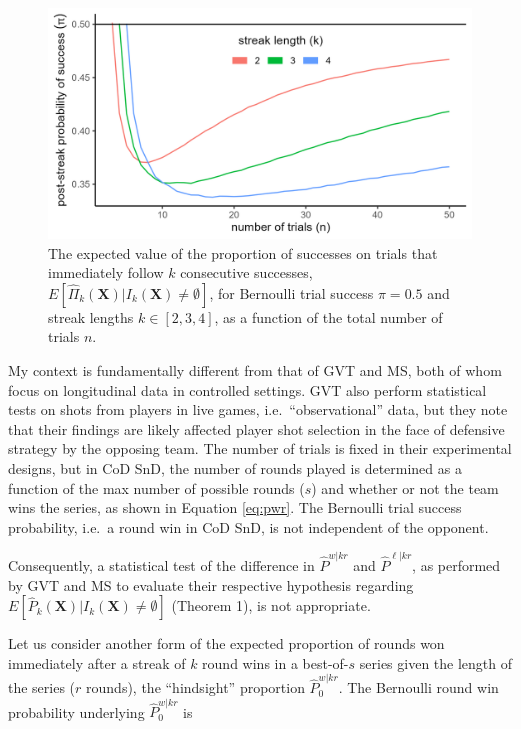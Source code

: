 \documentclass{article}
\begin{document}
\begin{figure}
\centering
\includegraphics{images/pwkr_ms.png}
\caption{The expected value of the proportion of successes on trials that immediately follow $k$ consecutive successes, $E[\hat{\Pi}_k(\mathbf{X}) | I_k(\mathbf{X}) \neq \emptyset]$, for Bernoulli trial success $\pi = 0.5$ and streak lengths $k \in [2, 3, 4]$, as a function of the total number of trials $n.$}
\end{figure}

My context is fundamentally different from that of GVT and MS, both of
whom focus on longitudinal data in controlled settings. GVT also perform
statistical tests on shots from players in live games,
i.e.~``observational'' data, but they note that their findings are
likely affected player shot selection in the face of defensive strategy
by the opposing team. The number of trials is fixed in their
experimental designs, but in CoD SnD, the number of rounds played is
determined as a function of the max number of possible rounds (\(s\))
and whether or not the team wins the series, as shown in Equation
\ref{eq:pwr}. The Bernoulli trial success probability, i.e.~a round win
in CoD SnD, is not independent of the opponent.

Consequently, a statistical test of the difference in \(\hat{P}^{w|kr}\)
and \(\hat{P}^{\ell|kr}\), as performed by GVT and MS to evaluate their
respective hypothesis regarding
\(E[\hat{P}_k(\mathbf{X}) | I_k(\mathbf{X}) \neq \emptyset]\) (Theorem
1), is not appropriate.

Let us consider another form of the expected proportion of rounds won
immediately after a streak of \(k\) round wins in a best-of-\(s\) series
given the length of the series (\(r\) rounds), the ``hindsight''
proportion \(\hat{P}^{w|kr}_0\). The Bernoulli round win probability
underlying \(\hat{P}^{w|kr}_0\) is
\end{document}
